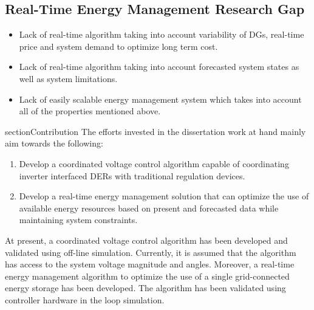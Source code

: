 \subsection{Real-Time Energy Management Research Gap}	
\begin{itemize}
    \item Lack of real-time algorithm taking into account variability of DGs, real-time price and system demand to optimize long term cost.
    \item Lack of real-time algorithm taking into account forecasted system states as well as system limitations.
    \item Lack of easily scalable energy management system which takes into account all of the properties mentioned above.
\end{itemize}

section{Contribution}
The efforts invested in the dissertation work at hand mainly aim towards the following:
 
\begin{enumerate}
    \item Develop a coordinated voltage control algorithm capable of coordinating inverter interfaced DERs with traditional regulation devices.
    \item Develop a real-time energy management solution that can optimize the use of available energy resources based on present and forecasted data while maintaining system constraints.
\end{enumerate}

At present, a coordinated voltage control algorithm has been developed and validated using off-line simulation. Currently, it is assumed that the algorithm has access to the system voltage magnitude and angles. Moreover, a real-time energy management algorithm to optimize the use of a single grid-connected energy storage has been developed. The algorithm has been validated using controller hardware in the loop simulation.